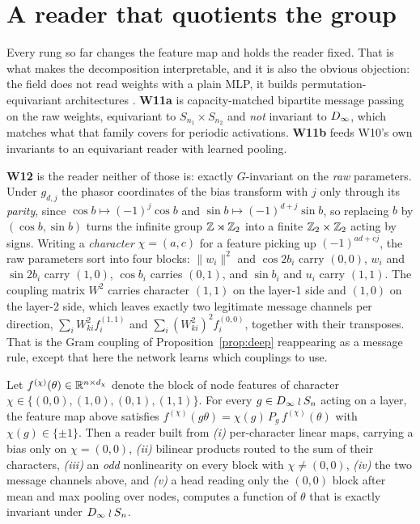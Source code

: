\section{A reader that quotients the group}\label{sec:reader}

Every rung so far changes the feature map and holds the reader fixed. That is what makes the
decomposition interpretable, and it is also the obvious objection: the field does not read weights
with a plain MLP, it builds permutation-equivariant architectures
\citep{navon2023dws,zhou2023nfn,lim2024gmn,kofinas2024graph,tran2024monomial}. \textbf{W11a} is
capacity-matched bipartite message passing on the raw weights, equivariant to
$S_{n_1}\times S_{n_2}$ and \emph{not} invariant to $D_\infty$, which matches what that family covers
for periodic activations. \textbf{W11b} feeds W10's own invariants to an equivariant reader with
learned pooling.

\textbf{W12} is the reader neither of those is: exactly $G$-invariant on the \emph{raw} parameters.
Under $g_{d,j}$ the phasor coordinates of the bias transform with $j$ only through its
\emph{parity}, since $\cos b \mapsto (-1)^j \cos b$ and $\sin b \mapsto (-1)^{d+j}\sin b$, so
replacing $b$ by $(\cos b, \sin b)$ turns the infinite group $\mathbb{Z}\rtimes\mathbb{Z}_2$ into a finite
$\mathbb{Z}_2\times\mathbb{Z}_2$ acting by signs. Writing a \emph{character} $\chi=(a,c)$ for a feature picking up
$(-1)^{ad+cj}$, the raw parameters sort into four blocks: $\|w_i\|^2$ and $\cos 2b_i$ carry
$(0,0)$, $w_i$ and $\sin 2b_i$ carry $(1,0)$, $\cos b_i$ carries $(0,1)$, and $\sin b_i$ and $u_i$
carry $(1,1)$. The coupling matrix $W^2$ carries character $(1,1)$ on the layer-1 side and $(1,0)$ on the
layer-2 side, which leaves exactly two legitimate message channels per direction,
$\sum_i W^2_{ki} f_i^{(1,1)}$ and $\sum_i (W^2_{ki})^2 f_i^{(0,0)}$, together with their transposes.
That is the Gram coupling of Proposition~\ref{prop:deep} reappearing as a message rule, except that
here the network learns which couplings to use.

\begin{proposition}\label{prop:w12}
Let $f^{(\chi)}(\theta) \in \mathbb{R}^{n \times d_\chi}$ denote the block of node features of character
$\chi \in \{(0,0),(1,0),(0,1),(1,1)\}$. For every $g \in D_\infty \wr S_n$ acting on a layer, the
feature map above satisfies $f^{(\chi)}(g\theta) = \chi(g)\, P_g\, f^{(\chi)}(\theta)$ with
$\chi(g) \in \{\pm1\}$. Then a reader built from \emph{(i)} per-character linear maps, carrying a
bias only on $\chi = (0,0)$, \emph{(ii)} bilinear products routed to the sum of their characters,
\emph{(iii)} an \emph{odd} nonlinearity on every block with $\chi \ne (0,0)$, \emph{(iv)} the two
message channels above, and \emph{(v)} a head reading only the $(0,0)$ block after mean and max
pooling over nodes, computes a function of $\theta$ that is exactly invariant under
$D_\infty \wr S_n$.
\end{proposition}

